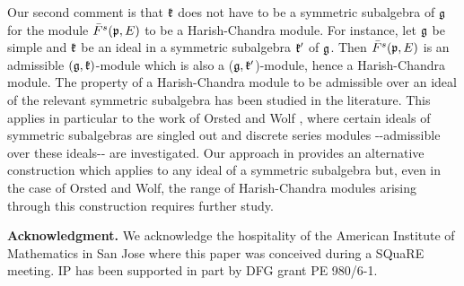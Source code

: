 \documentclass[12pt]{amsart}
\makeatletter
\def\mathfrak{\frak}
\def\@putname#1#2#3#4{\def\@@ref{#3}\let\old@bf\bf
        \def\bf##1{\old@bf\if?\noexpand##1?{#4}\else##1\fi}%
        #1{#2}%
        \let\bf\old@bf}
\def\@putname#1#2#3#4{\def\@@ref{#3}\let\old@bf\bf    %
        \let\old@reset@font\reset@font                  %
        \def\bf##1{\old@bf\if?\noexpand##1?{#4}\else##1\fi}%
        \def\reset@font##1##2{\old@reset@font##1\if?\noexpand##2?{#4}\else##2\fi}#1{#2}%
        \let\bf\old@bf\let\reset@font\old@reset@font}
\let\my@cite=\cite
\def\cite#1{\@putname\my@cite{#1}{\@citeb}{\tiny\rm\@@ref}}
\theoremstyle{plain} %
\numberwithin{equation}{section}
\theoremstyle{definition}
\theoremstyle{remark}
\theoremstyle{plain} %
\newcommand{\fg}{\mathfrak{g}}
\newcommand{\fk}{\mathfrak{k}}
\makeatother
\begin{document}
Our second comment is that $\fk$ does not have to be a symmetric subalgebra of $\fg$ for the module $\bar{F}^s(\mathfrak{p},E)$ to be  a Harish-Chandra module. For instance, let $\fg$ be simple and $\fk$ be an ideal in a symmetric subalgebra $\fk'$ of $\fg$. Then $\bar{F}^s(\mathfrak{p},E)$ is an admissible $(\fg,\fk)$-module which is also a ($\fg,\fk'$)-module,  hence a Harish-Chandra module. The property of  a Harish-Chandra module to be admissible over an ideal of the relevant symmetric subalgebra has been studied in the literature. This applies in particular to the work of Orsted and Wolf \cite{OW}, where certain ideals of symmetric subalgebras are singled out and discrete series modules -$ $-admissible over these ideals-$ $- are investigated. Our approach in \cite{PZ1} provides an alternative construction which applies to any ideal of a symmetric subalgebra but, even in the case of Orsted and Wolf, the range of Harish-Chandra modules arising through this construction  requires further study.


{\bf Acknowledgment.} We acknowledge the hospitality of the American Institute of Mathematics in San Jose where this paper was conceived during a SQuaRE meeting. IP has been supported in part by DFG grant PE 980/6-1.  
\end{document}

